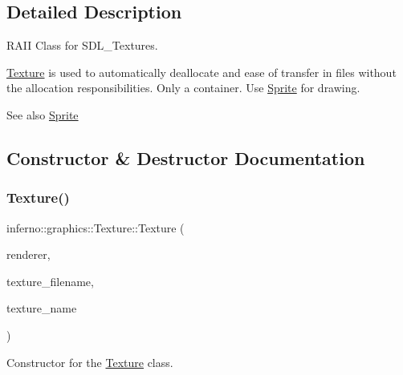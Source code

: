 \subsection{Detailed Description}
R\+A\+II Class for S\+D\+L\+\_\+\+Textures. 

\mbox{\hyperlink{classinferno_1_1graphics_1_1_texture}{Texture}} is used to automatically deallocate and ease of transfer in files without the allocation responsibilities. Only a container. Use \mbox{\hyperlink{classinferno_1_1graphics_1_1_sprite}{Sprite}} for drawing. \begin{DoxySeeAlso}{See also}
\mbox{\hyperlink{classinferno_1_1graphics_1_1_sprite}{Sprite}} 
\end{DoxySeeAlso}


\subsection{Constructor \& Destructor Documentation}
\mbox{\label{classinferno_1_1graphics_1_1_texture_addc70b7b802cc870d9f4647cba3708ac}} 
\subsubsection{\texorpdfstring{Texture()}{Texture()}\hspace{0.1cm}{\footnotesize\ttfamily [1/2]}}
{\footnotesize\ttfamily inferno\+::graphics\+::\+Texture\+::\+Texture (\begin{DoxyParamCaption}\item[{S\+D\+L\+\_\+\+Renderer $\ast$}]{renderer,  }\item[{std\+::string}]{texture\+\_\+filename,  }\item[{std\+::string}]{texture\+\_\+name }\end{DoxyParamCaption})}



Constructor for the \mbox{\hyperlink{classinferno_1_1graphics_1_1_texture}{Texture}} class. 

